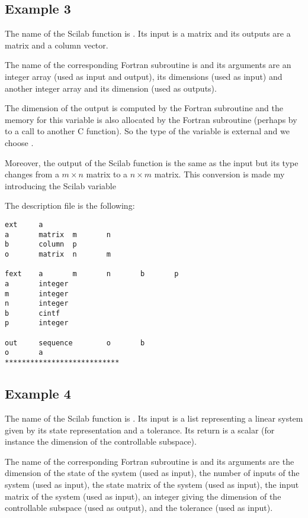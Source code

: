 \subsection{Example 3}
\label{ex3}

The name of the Scilab function is . Its input is a matrix and its
outputs are a matrix and a column vector.

The name of the corresponding Fortran subroutine is  and its arguments
are an integer array (used as input and output), its dimensions (used as
input) and another integer array and its dimension (used as outputs).

The dimension  of the output  is computed by the Fortran subroutine
and the memory for this variable is also allocated by the Fortran subroutine
(perhaps by to a call to another C function). So the type of the variable is
external and we choose .

Moreover, the output  of the Scilab function is the same as the input
but its type changes from a $m \times n$ matrix to a $n \times m$ matrix. This
conversion is made my introducing the Scilab variable 

The description file is the following:
\begin{verbatim}
ext     a
a       matrix  m       n
b       column  p
o       matrix  n       m

fext    a       m       n       b       p
a       integer
m       integer
n       integer
b       cintf
p       integer

out     sequence        o       b
o       a
***************************
\end{verbatim}

\subsection{Example 4}
\label{ex4}

The name of the Scilab function is . Its input is a list representing
a linear system given by its state representation and a tolerance. Its return
is a scalar (for instance the dimension of the controllable subspace).

The name of the corresponding Fortran subroutine is  and its
arguments are the dimension of the state of the system (used as input), the
number of inputs of the system (used as input), 
the state matrix of the system (used as input),
the input matrix of the system (used as input),
an integer giving the dimension of the controllable subspace (used as output),
and the tolerance (used as input).

